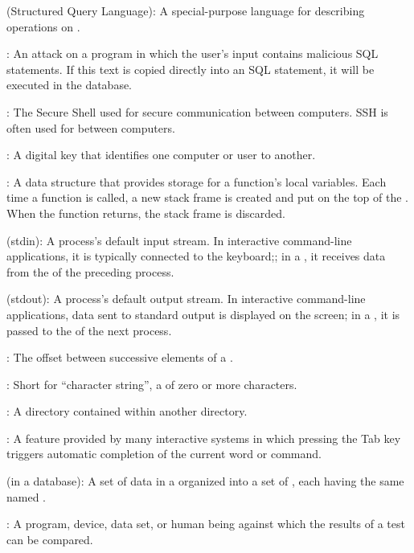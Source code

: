  (Structured Query Language):
A special-purpose language for
describing operations on .

:
An attack on a program in which the
user's input contains malicious SQL statements. If this text is copied
directly into an SQL statement, it will be executed in the database.

:
The Secure Shell  used for secure communication between computers.
SSH is often used for  between computers.

:
A digital key that identifies one computer or user to another.

:
A data structure that provides storage for a
function's local variables. Each time a function is called, a new stack
frame is created and put on the top of the . When the function returns, the stack frame is discarded.

 (stdin):
A process's default input stream. In
interactive command-line applications, it is typically connected to the
keyboard;; in a , it receives data from the
 of the preceding process.

 (stdout):
A process's default output stream. In
interactive command-line applications, data sent to standard output is
displayed on the screen; in a , it is passed to
the  of the next process.

:
The offset between successive elements of a
.

:
Short for ``character string'', a
 of zero or more characters.

:
A directory contained within another directory.

:
A feature provided by many interactive systems
in which pressing the Tab key triggers automatic completion of the
current word or command.

 (in a database):
A set of data in a
 organized into a
set of , each having the same named
.

:
A program, device, data set, or human being
against which the results of a test can be compared.

